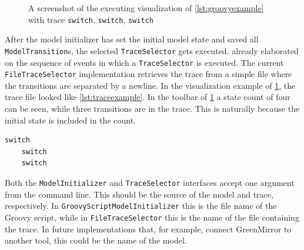 \documentclass[a4paper]{article}
\begin{document}
	\begin{figure}[H]
	\centering
	\caption{A screenshot of the executing visualization of \cref{lst:groovyexample} with trace \lstinline{switch}, \lstinline{switch}, \lstinline{switch}}
	\label{fig:groovyexample}
	\end{figure}
	
	After the model initializer has set the initial model state and saved all \lstinline{ModelTransition}s, the selected \lstinline{TraceSelector} gets executed.  already elaborated on the sequence of events in which a \lstinline{TraceSelector} is executed. The current \lstinline{FileTraceSelector} implementation retrieves the trace from a simple file where the transitions are separated by a newline. In the visualization example of \cref{fig:groovyexample}, the trace file looked like \cref{lst:traceexample}. In the toolbar of \cref{fig:groovyexample} a state count of four can be seen, while three transitions are in the trace. This is naturally because the initial state is included in the count.	
	\begin{lstlisting}[label={lst:traceexample}, caption={Example trace file}]
	switch
	switch
	switch
	\end{lstlisting}
	Both the \lstinline{ModelInitializer} and \lstinline{TraceSelector} interfaces accept one argument from the command line. This should be the source of the model and trace, respectively. In \lstinline{GroovyScriptModelInitializer} this is the file name of the Groovy script, while in \lstinline{FileTraceSelector} this is the name of the file containing the trace. In future implementations that, for example, connect GreenMirror to another tool, this could be the name of the model.
	
\end{document}
